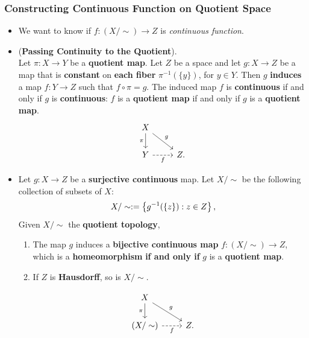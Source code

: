 \documentclass[11pt]{article}
\begin{document}
\subsubsection{Constructing Continuous Function on Quotient Space}
\begin{itemize}
\item We want to know if $f: (X/\sim) \rightarrow Z$ is \emph{continuous function}. 

\item \begin{theorem}  (\textbf{Passing Continuity to the Quotient}). \citep{munkres2000topology}\\
Let $\pi: X \rightarrow Y$ be a \textbf{quotient map}. Let $Z$ be a space and let $g : X \rightarrow Z$ be a map that is \textbf{constant} on \textbf{each fiber}  $\pi^{-1}(\{y\})$, for $y \in Y$. Then $g$ \textbf{induces} a map $f: Y \rightarrow Z$ such that $f \circ \pi = g$. The induced map $f$ is \textbf{continuous} if and only
if $g$ is \textbf{continuous}: $f$ is a \textbf{quotient map} if and only if $g$ is a \textbf{quotient map}.
\[
  \begin{tikzcd}
     X  \arrow[swap]{d}{\pi} \arrow[dr, "g"]  & \\
     Y   \arrow[r, swap, dashed,  "f"]  & Z.
  \end{tikzcd}
\] 
\end{theorem}

\item \begin{corollary}
Let $g : X \rightarrow Z$ be a \textbf{surjective continuous} map. Let $X/\sim$ be the following collection of subsets of $X$:
\begin{align*}
X/\sim := \left\{g^{-1}(\{z\}): z \in Z \right\},
\end{align*}
Given $X/\sim$ the \textbf{quotient topology},
\begin{enumerate}
\item The map $g$ induces a \textbf{bijective continuous map} $f : (X/\sim) \rightarrow Z$, which is a \textbf{homeomorphism} \textbf{if and only if} $g$ is a \textbf{quotient map}.
\item If $Z$ is \textbf{Hausdorff}, so is $X/\sim$.
\end{enumerate}
\[
  \begin{tikzcd}
     X  \arrow[swap]{d}{\pi} \arrow[dr, "g"]  & \\
     (X/\sim)   \arrow[r, swap, dashed,  "f"]  & Z.
  \end{tikzcd}
\] 
\end{corollary}


\end{itemize}
\end{document}
